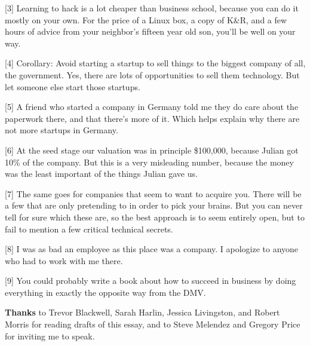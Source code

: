 [3]
                    Learning to hack is a lot cheaper than business school,
                    because you can do it mostly on your own. For the price of a
                    Linux box, a copy of K\&R, and a few hours of advice from
                    your neighbor's fifteen year old son, you'll be well on your
                    way.

[4] Corollary: Avoid starting a startup to
                    sell things to the biggest company of all, the government.
                    Yes, there are lots of opportunities to sell them
                    technology. But let someone else start those startups.

[5]
                    A friend who started a company in Germany told me they do
                    care about the paperwork there, and that there's more of it.
                    Which helps explain why there are not more startups in
                    Germany.

[6] At the seed stage our valuation was
                    in principle \$100,000, because Julian got 10\% of the
                    company. But this is a very misleading number, because the
                    money was the least important of the things Julian gave
                    us.

[7] The same goes for companies that seem to
                    want to acquire you. There will be a few that are only
                    pretending to in order to pick your brains. But you can
                    never tell for sure which these are, so the best approach is
                    to seem entirely open, but to fail to mention a few critical
                    technical secrets.

[8] I was as bad an employee
                    as this place was a company. I apologize to anyone who had
                    to work with me there.

[9] You could probably
                    write a book about how to succeed in business by doing
                    everything in exactly the opposite way from the DMV.

\textbf{Thanks}
                    to Trevor Blackwell, Sarah Harlin, Jessica Livingston, and
                    Robert Morris for reading drafts of this essay, and to Steve
                    Melendez and Gregory Price for inviting me to speak.



              
            
          
